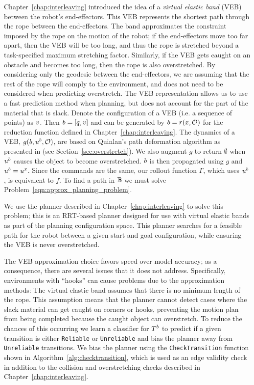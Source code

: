 Chapter~\ref{chap:interleaving} introduced the idea of a \textit{virtual elastic band} (VEB) between the robot's end-effectors. This VEB represents the shortest path through the rope between the end-effectors. The band approximates the constraint imposed by the rope on the motion of the robot; if the end-effectors move too far apart, then the VEB will be too long, and thus the rope is stretched beyond a task-specified maximum stretching factor. Similarly, if the VEB gets caught on an obstacle and becomes too long, then the rope is also overstretched. By considering only the geodesic between the end-effectors, we are assuming that the rest of the rope will comply to the environment, and does not need to be considered when predicting overstretch. The VEB representation allows us to use a fast prediction method when planning, but does not account for the part of the material that is slack. Denote the configuration of a VEB (i.e. a sequence of points) as $v$. Then $b = [q,v]$ and can be generated by $b = r(x,\mathcal{O})$ for the reduction function defined in Chapter~\ref{chap:interleaving}. The dynamics of a VEB, $g(b,u^b,\mathcal{O})$, are based on Quinlan's path deformation algorithm as presented in \cite{Quinlan1994} (see Section~\ref{sec:overstretch}). We also augment $g$ to return $\emptyset$ when $u^b$ causes the object to become overstretched. $b$ is then propagated using $g$ and $u^b = u^x$. Since the commands are the same, our rollout function $\Gamma$, which uses $u^b$, is equivalent to $f$. To find a path in $\mathbb{B}$ we must solve Problem~\eqref{eqn:approx_planning_problem}.

We use the planner described in Chapter~\ref{chap:interleaving} to solve this problem; this is an RRT-based planner designed for use with virtual elastic bands as part of the planning configuration space. This planner searches for a feasible path for the robot between a given start and goal configuration, while ensuring the VEB is never overstretched.

The VEB approximation choice favors speed over model accuracy; as a consequence, there are several issues that it does not address. Specifically, environments with ``hooks'' can cause problems due to the approximation methods: The virtual elastic band assumes that there is no minimum length of the rope. This assumption means that the planner cannot detect cases where the slack material can get caught on corners or hooks, preventing the motion plan from being completed because the caught object can overstretch. To reduce the chances of this occurring we learn a classifier for $T^b$ to predict if a given transition is either \texttt{Reliable} or \texttt{Unreliable} and bias the planner away from \texttt{Unreliable} transitions. We bias the planner using the \texttt{CheckTransition} function shown in Algorithm~\ref{alg:checktransition}, which is used as an edge validity check in addition to the collision and overstretching checks described in Chapter~\ref{chap:interleaving}.

